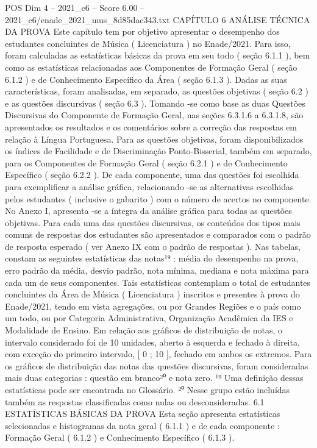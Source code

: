 \begin{textsample}{POS Dim 4 – 2021\_c6 – Score 6.00 – 2021\_c6/enade\_2021\_mus\_8d85dac343.txt}  \label{ex:f4_pos_064}
CAPÍTULO 6 ANÁLISE TÉCNICA DA PROVA Este capítulo tem por objetivo apresentar o desempenho dos estudantes concluintes de Música ( Licenciatura ) no Enade/2021.
Para isso, foram calculadas as estatísticas básicas da prova em seu todo ( seção 6.1.1 ), bem como as estatísticas relacionadas aos Componentes de Formação Geral ( seção 6.1.2 ) e de Conhecimento Específico da Área ( seção 6.1.3 ).
Dadas as suas características, foram analisadas, em separado, as questões objetivas ( seção 6.2 ) e as questões discursivas ( seção 6.3 ).
Tomando -se como base as duas Questões Discursivas do Componente de Formação Geral, nas seções 6.3.1.6 a 6.3.1.8, são apresentados os resultados e os comentários sobre a correção das respostas em relação à Língua Portuguesa.
Para as questões objetivas, foram disponibilizados os índices de Facilidade e de Discriminação Ponto-Bisserial, também em separado, para os Componentes de Formação Geral ( seção 6.2.1 ) e de Conhecimento Específico ( seção 6.2.2 ).
De cada componente, uma das questões foi escolhida para exemplificar a análise gráfica, relacionando -se as alternativas escolhidas pelos estudantes ( inclusive o gabarito ) com o número de acertos no componente.
No Anexo I, apresenta -se a íntegra da análise gráfica para todas as questões objetivas.
Para cada uma das questões discursivas, os conteúdos dos tipos mais comuns de respostas dos estudantes são apresentados e comparados com o padrão de resposta esperado ( ver Anexo IX com o padrão de respostas ).
Nas tabelas, constam as seguintes estatísticas das notas¹⁹ : média do desempenho na prova, erro padrão da média, desvio padrão, nota mínima, mediana e nota máxima para cada um de seus componentes.
Tais estatísticas contemplam o total de estudantes concluintes da Área de Música ( Licenciatura ) inscritos e presentes à prova do Enade/2021, tendo em vista agregações, ou por Grandes Regiões e o país como um todo, ou por Categoria Administrativa, Organização Acadêmica da IES e Modalidade de Ensino.
Em relação aos gráficos de distribuição de notas, o intervalo considerado foi de 10 unidades, aberto à esquerda e fechado à direita, com exceção do primeiro intervalo, [ 0 ; 10 ], fechado em ambos os extremos.
Para os gráficos de distribuição das notas das questões discursivas, foram consideradas mais duas categorias : questão em branco²⁰ e nota zero. ¹⁹ Uma definição dessas estatísticas pode ser encontrada no Glossário. ²⁰ Nesse grupo estão incluídas também as respostas classificadas como nulas ou desconsideradas. 6.1 ESTATÍSTICAS BÁSICAS DA PROVA Esta seção apresenta estatísticas selecionadas e histogramas da nota geral ( 6.1.1 ) e de cada componente : Formação Geral ( 6.1.2 ) e Conhecimento Específico ( 6.1.3 ).

\end{textsample}
